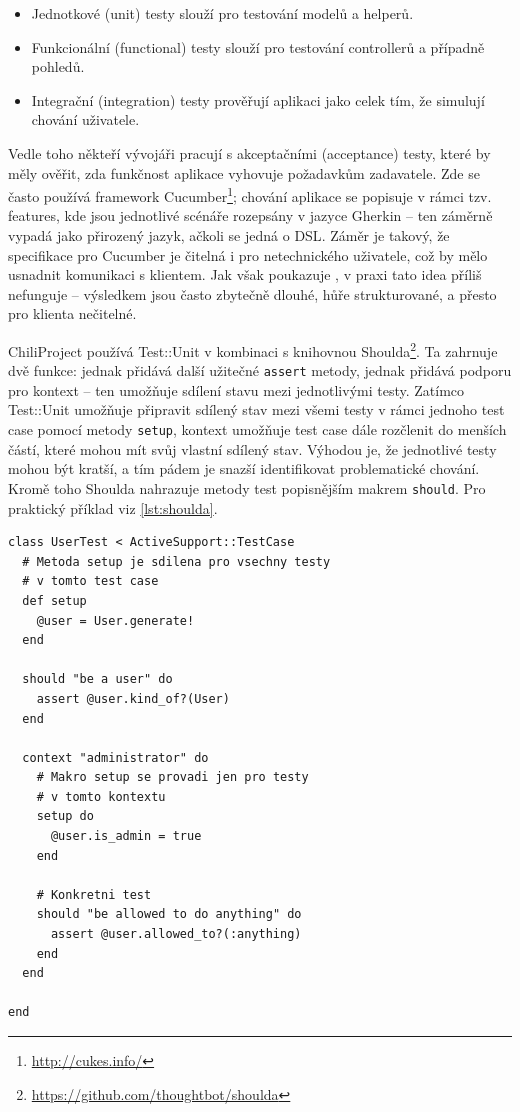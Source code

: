 \documentclass[thesis=B,czech]{FITthesis}[2012/05/02]
\begin{document}
\begin{itemize}
\item
  Jednotkové (unit) testy slouží pro testování modelů a helperů.
\item
  Funkcionální (functional) testy slouží pro testování controllerů a
  případně pohledů.
\item
  Integrační (integration) testy prověřují aplikaci jako celek tím, že
  simulují chování uživatele.
\end{itemize}
Vedle toho někteří vývojáři pracují s akceptačními (acceptance) testy,
které by měly ověřit, zda funkčnost aplikace vyhovuje požadavkům
zadavatele. Zde se často používá framework Cucumber\footnote{\url{http://cukes.info/}};
chování aplikace se popisuje v rámci tzv. features, kde jsou jednotlivé
scénáře rozepsány v jazyce Gherkin -- ten záměrně vypadá jako přirozený
jazyk, ačkoli se jedná o \gls{DSL}. Záměr je takový, že specifikace pro
Cucumber je čitelná i pro netechnického uživatele, což by mělo usnadnit
komunikaci s klientem. Jak však poukazuje \citep{Kinsella2011}, v praxi
tato idea příliš nefunguje -- výsledkem jsou často  zbytečně dlouhé, hůře strukturované, a přesto pro
klienta nečitelné.

ChiliProject používá Test::Unit v kombinaci s knihovnou
Shoulda\footnote{\url{https://github.com/thoughtbot/shoulda}}. Ta
zahrnuje dvě funkce: jednak přidává další užitečné \lstinline!assert!
metody, jednak přidává podporu pro kontext -- ten umožňuje sdílení stavu
mezi jednotlivými testy. Zatímco Test::Unit umožňuje připravit sdílený
stav mezi všemi testy v rámci jednoho test case pomocí metody
\lstinline!setup!, kontext umožňuje test case dále rozčlenit do menších
částí, které mohou mít svůj vlastní sdílený stav. Výhodou je,
že jednotlivé testy mohou být kratší, a tím pádem je snazší
identifikovat problematické chování. Kromě toho Shoulda nahrazuje metody
test popisnějším makrem \lstinline!should!. Pro praktický příklad viz \autoref{lst:shoulda}.

\begin{lstlisting}[float,caption={Test case s frameworky Test::Unit a Shoulda},label=lst:shoulda]
class UserTest < ActiveSupport::TestCase
  # Metoda setup je sdilena pro vsechny testy
  # v tomto test case
  def setup
    @user = User.generate!
  end

  should "be a user" do
    assert @user.kind_of?(User)
  end

  context "administrator" do
    # Makro setup se provadi jen pro testy
    # v tomto kontextu
    setup do
      @user.is_admin = true
    end

    # Konkretni test
    should "be allowed to do anything" do
      assert @user.allowed_to?(:anything)
    end
  end

end
\end{lstlisting}
\end{document}
